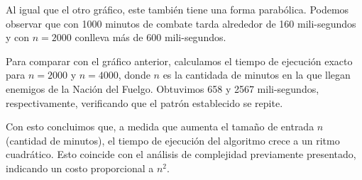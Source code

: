 \documentclass{article}
\begin{document}
Al igual que el otro gráfico, este también tiene una forma parabólica. Podemos observar que con 1000 minutos de combate tarda alrededor de 160 mili-segundos y con $n = 2000$ conlleva más de 600 mili-segundos. 

Para comparar con el gráfico anterior, calculamos el tiempo de ejecución exacto para $n = 2000$ y $n = 4000$, donde $n$ es la cantidada de minutos en la que llegan enemigos de la Nación del Fuelgo. Obtuvimos 658 y 2567 mili-segundos, respectivamente, verificando que el patrón establecido se repite.

Con esto concluimos que, a medida que aumenta el tamaño de entrada $n$ (cantidad de minutos), el tiempo de ejecución del algoritmo crece a un ritmo cuadrático. Esto coincide con el análisis de complejidad previamente presentado, indicando un costo proporcional a $n^2$.
\end{document}
